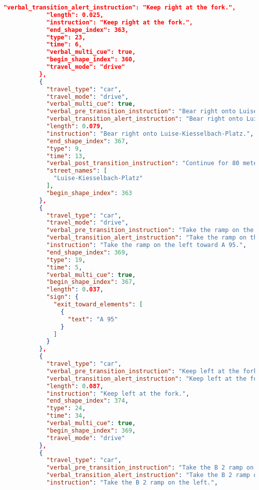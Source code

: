 \begin{lstlisting}[language=json,breaklines=true]
            "verbal_transition_alert_instruction": "Keep right at the fork.",
            "length": 0.025,
            "instruction": "Keep right at the fork.",
            "end_shape_index": 363,
            "type": 23,
            "time": 6,
            "verbal_multi_cue": true,
            "begin_shape_index": 360,
            "travel_mode": "drive"
          },
          {
            "travel_type": "car",
            "travel_mode": "drive",
            "verbal_multi_cue": true,
            "verbal_pre_transition_instruction": "Bear right onto Luise-Kiesselbach-Platz. Then Take the ramp on the left toward A 95.",
            "verbal_transition_alert_instruction": "Bear right onto Luise-Kiesselbach-Platz.",
            "length": 0.079,
            "instruction": "Bear right onto Luise-Kiesselbach-Platz.",
            "end_shape_index": 367,
            "type": 9,
            "time": 13,
            "verbal_post_transition_instruction": "Continue for 80 meters.",
            "street_names": [
              "Luise-Kiesselbach-Platz"
            ],
            "begin_shape_index": 363
          },
          {
            "travel_type": "car",
            "travel_mode": "drive",
            "verbal_pre_transition_instruction": "Take the ramp on the left toward A 95. Then Keep left at the fork.",
            "verbal_transition_alert_instruction": "Take the ramp on the left toward A 95.",
            "instruction": "Take the ramp on the left toward A 95.",
            "end_shape_index": 369,
            "type": 19,
            "time": 5,
            "verbal_multi_cue": true,
            "begin_shape_index": 367,
            "length": 0.037,
            "sign": {
              "exit_toward_elements": [
                {
                  "text": "A 95"
                }
              ]
            }
          },
          {
            "travel_type": "car",
            "verbal_pre_transition_instruction": "Keep left at the fork. Then Take the B 2 ramp on the left.",
            "verbal_transition_alert_instruction": "Keep left at the fork.",
            "length": 0.087,
            "instruction": "Keep left at the fork.",
            "end_shape_index": 374,
            "type": 24,
            "time": 34,
            "verbal_multi_cue": true,
            "begin_shape_index": 369,
            "travel_mode": "drive"
          },
          {
            "travel_type": "car",
            "verbal_pre_transition_instruction": "Take the B 2 ramp on the left.",
            "verbal_transition_alert_instruction": "Take the B 2 ramp on the left.",
            "instruction": "Take the B 2 ramp on the left.",

\end{lstlisting}
